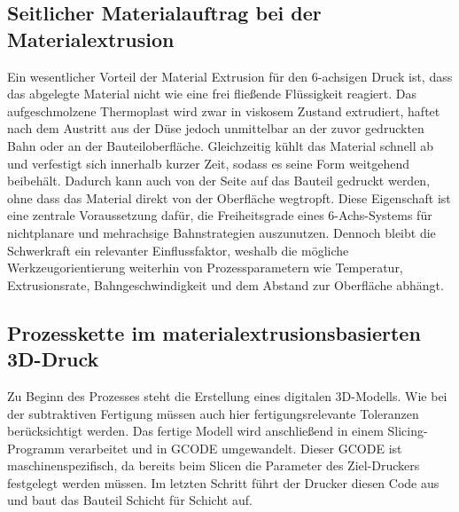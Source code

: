         \subsection{Seitlicher Materialauftrag bei der Materialextrusion}\label{subsec:sideways-material-extrusion}
        Ein wesentlicher Vorteil der Material Extrusion für den 6-achsigen Druck ist,
        dass das abgelegte Material nicht wie eine frei fließende Flüssigkeit reagiert.
        Das aufgeschmolzene Thermoplast wird zwar in viskosem Zustand extrudiert,
        haftet nach dem Austritt aus der Düse jedoch unmittelbar an der zuvor gedruckten Bahn oder an der Bauteiloberfläche.
        Gleichzeitig kühlt das Material schnell ab und verfestigt sich innerhalb kurzer Zeit,
        sodass es seine Form weitgehend beibehält.
        Dadurch kann auch von der Seite auf das Bauteil gedruckt werden,
        ohne dass das Material direkt von der Oberfläche wegtropft.
        Diese Eigenschaft ist eine zentrale Voraussetzung dafür,
        die Freiheitsgrade eines 6-Achs-Systems für nichtplanare und mehrachsige Bahnstrategien auszunutzen.
        Dennoch bleibt die Schwerkraft ein relevanter Einflussfaktor,
        weshalb die mögliche Werkzeugorientierung weiterhin von Prozessparametern wie Temperatur,
        Extrusionsrate, Bahngeschwindigkeit und dem Abstand zur Oberfläche abhängt.


        \subsection{Prozesskette im materialextrusionsbasierten 3D-Druck}\label{subsec:process-chain-in-material-extrusion-3d-printing}
        Zu Beginn des Prozesses steht die Erstellung eines digitalen 3D-Modells.
        Wie bei der subtraktiven Fertigung müssen auch hier fertigungsrelevante Toleranzen berücksichtigt werden.
        Das fertige Modell wird anschließend in einem Slicing-Programm verarbeitet und in \ac{GCODE} umgewandelt.
        Dieser \ac{GCODE} ist maschinenspezifisch, da bereits beim Slicen die Parameter des Ziel-Druckers festgelegt werden müssen.
        Im letzten Schritt führt der Drucker diesen Code aus und baut das Bauteil Schicht für Schicht auf.
        \cite{gibsonAdditiveManufacturingTechnologies2010}
        \cite{yeshiwasReviewArticleAssessment2025}

